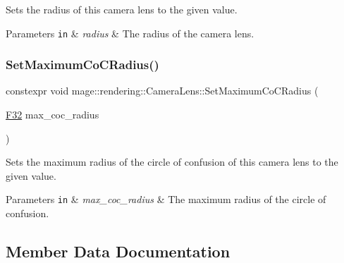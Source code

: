 Sets the radius of this camera lens to the given value.


\begin{DoxyParams}[1]{Parameters}
\mbox{\tt in}  & {\em radius} & The radius of the camera lens. \\
\hline
\end{DoxyParams}
\mbox{\label{classmage_1_1rendering_1_1_camera_lens_a08305f9e891cbdc4152deccbbf287c7f}} 
\subsubsection{\texorpdfstring{Set\+Maximum\+Co\+C\+Radius()}{SetMaximumCoCRadius()}}
{\footnotesize\ttfamily constexpr void mage\+::rendering\+::\+Camera\+Lens\+::\+Set\+Maximum\+Co\+C\+Radius (\begin{DoxyParamCaption}\item[{\mbox{\hyperlink{namespacemage_aa97e833b45f06d60a0a9c4fc22ae02c0}{F32}}}]{max\+\_\+coc\+\_\+radius }\end{DoxyParamCaption})\hspace{0.3cm}{\ttfamily [noexcept]}}

Sets the maximum radius of the circle of confusion of this camera lens to the given value.


\begin{DoxyParams}[1]{Parameters}
\mbox{\tt in}  & {\em max\+\_\+coc\+\_\+radius} & The maximum radius of the circle of confusion. \\
\hline
\end{DoxyParams}


\subsection{Member Data Documentation}
\mbox{\label{classmage_1_1rendering_1_1_camera_lens_a3459fd7d208a7ad8f1cf01718e008e36}} 
